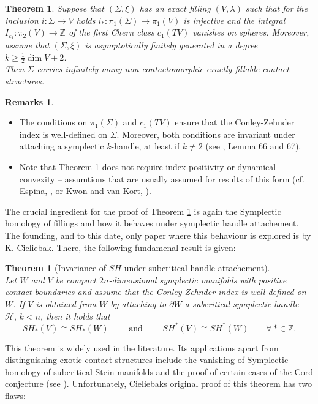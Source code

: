\documentclass[a4paper,12pt,bibliography=totocnumbered,titlepage=false,abstracton,bookmarksnumbered=true]{scrartcl}
\newtheorem{theo}[defn]{Theorem}
\theoremstyle{definition}
\newtheorem*{rem}{Remarks}
\begin{document}
\begin{theo}\label{theoinfinitecontactstr} 
 Suppose that $(\Sigma,\xi)$ has an exact filling $(V,\lambda)$ such that for the inclusion $i:\Sigma\rightarrow V$ holds $i_\ast: \pi_1(\Sigma)\rightarrow\pi_1(V)$ is injective and the integral 
  $I_{c_1}:\pi_2(V)\rightarrow\mathbb{Z}$ of the first Chern class $c_1(TV)$ vanishes on spheres. Moreover, assume that $(\Sigma,\xi)$ is asymptotically finitely generated in a degree $k\geq \frac{1}{2}\dim V+2$.\\ Then $\Sigma$ carries infinitely many non-contactomorphic exactly fillable contact structures.
\end{theo}
\begin{rem}~
\begin{itemize}
 \item The conditions on $\pi_1(\Sigma)$ and $c_1(TV)$ ensure that the Conley-Zehnder index is well-defined on $\Sigma$. Moreover, both conditions are invariant under attaching a symplectic $k$-handle, at least if $k\neq 2$ (see \cite{FauckThesis}, Lemma 66 and 67).
 \item Note that Theorem \ref{theoinfinitecontactstr} does not require index positivity or dynamical convexity -- assumtions that are usually assumed for results of this form (cf. Espina, \cite{Esp}, or Kwon and van Kort, \cite{KwKo}).
\end{itemize}
\end{rem}
The crucial ingredient for the proof of Theorem \ref{theoinfinitecontactstr} is again the Symplectic homology of fillings and how it behaves under symplectic handle attachement. The founding, and to this date, only paper where this behaviour is explored is \cite{Cie} by K. Cieliebak. There, the following fundamenal result is given:
\begin{theo}[Invariance of $SH$ under subcritical handle attachement]\label{theoinvsur}~\\
 Let $W$ and $V$ be compact $2n$-dimensional symplectic manifolds with positive contact boundaries and assume that the Conley-Zehnder index is well-defined on $W$. If $V$ is obtained from $W$ by attaching to $\partial W$ a subcritical symplectic handle $\mathcal{H},\,k<n$, then it holds that \[SH_\ast(V)\cong SH_\ast(W)\qquad\text{ and }\qquad SH^\ast(V)\cong SH^\ast(W)\qquad \forall\, \ast\in\mathbb{Z}.\]
\end{theo}
This theorem is widely used in the literature. Its applications apart from distinguishing exotic contact structures include the vanishing of Symplectic homology of subcritical Stein manifolds and the proof of certain cases of the Cord conjecture (see \cite{Cie}). Unfortunately, Cieliebaks original proof of this theorem has two flaws:
\end{document}
